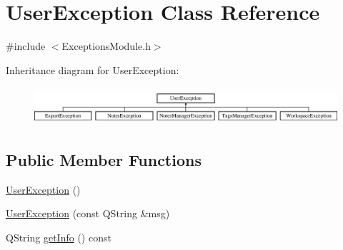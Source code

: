 \hypertarget{class_user_exception}{\section{User\-Exception Class Reference}
\label{class_user_exception}
}


{\ttfamily \#include $<$Exceptions\-Module.\-h$>$}

Inheritance diagram for User\-Exception\-:\begin{figure}[H]
\begin{center}
\leavevmode
\includegraphics[height=1.417722cm]{class_user_exception}
\end{center}
\end{figure}
\subsection*{Public Member Functions}
\begin{DoxyCompactItemize}
\item 
\hyperlink{class_user_exception_a11ef0dec3eb2fb07924f67383f20ad58}{User\-Exception} ()
\item 
\hyperlink{class_user_exception_a4ac40b2bdcd7cc042aa75105d327426c}{User\-Exception} (const Q\-String \&msg)
\item 
Q\-String \hyperlink{class_user_exception_ac87f5b285cf580d43e9507be4d1a936c}{get\-Info} () const 
\end{DoxyCompactItemize}


